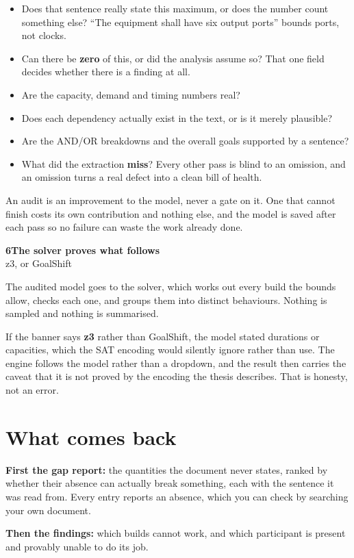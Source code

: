 \documentclass[11pt,a4paper]{article}
\newcommand{\stage}[3]{%
  \vspace{7pt}%
  {\bfseries\color{accent}#1\quad#2}\\[1pt]%
  {\small\color{muted}#3}\par\vspace{2pt}}
\begin{document}
\begin{itemize}
\item Does that sentence really state this maximum, or does the number count
      something else? ``The equipment shall have six output ports'' bounds ports,
      not clocks.
\item Can there be \textbf{zero} of this, or did the analysis assume so? That one
      field decides whether there is a finding at all.
\item Are the capacity, demand and timing numbers real?
\item Does each dependency actually exist in the text, or is it merely plausible?
\item Are the AND/OR breakdowns and the overall goals supported by a sentence?
\item What did the extraction \textbf{miss}? Every other pass is blind to an
      omission, and an omission turns a real defect into a clean bill of health.
\end{itemize}

An audit is an improvement to the model, never a gate on it. One that cannot
finish costs its own contribution and nothing else, and the model is saved after
each pass so no failure can waste the work already done.

\stage{6}{The solver proves what follows}{z3, or GoalShift}
The audited model goes to the solver, which works out every build the bounds
allow, checks each one, and groups them into distinct behaviours. Nothing is
sampled and nothing is summarised.

If the banner says \textbf{z3} rather than GoalShift, the model stated durations
or capacities, which the SAT encoding would silently ignore rather than use. The
engine follows the model rather than a dropdown, and the result then carries the
caveat that it is not proved by the encoding the thesis describes. That is
honesty, not an error.

\section*{What comes back}

\textbf{First the gap report:} the quantities the document never states, ranked by
whether their absence can actually break something, each with the sentence it was
read from. Every entry reports an absence, which you can check by searching your
own document.

\textbf{Then the findings:} which builds cannot work, and which participant is
present and provably unable to do its job.
\end{document}
